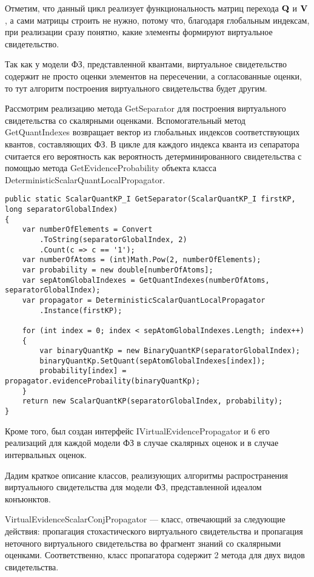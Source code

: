  Отметим, что данный цикл реализует функциональность матриц перехода  $\mathbf{Q}$ и $\mathbf{V}$, а сами матрицы строить не нужно, потому что, благодаря глобальным индексам, при реализации сразу понятно, какие элементы формируют виртуальное свидетельство.
 
 Так как у модели ФЗ, представленной квантами, виртуальное свидетельство содержит не просто оценки элементов на пересечении, а согласованные оценки, то тут алгоритм построения виртуального свидетельства будет другим. 
 
 Рассмотрим реализацию метода GetSeparator для построения виртуального свидетельства со скалярными оценками.  Вспомогательный метод GetQuantIndexes возвращает вектор из глобальных индексов соответствующих квантов, составляющих ФЗ.  В цикле для каждого индекса кванта из сепаратора считается его вероятность как вероятность детерминированного свидетельства с помощью метода GetEvidenceProbability объекта класса DeterministicScalarQuantLocalPropagator.
 
 \begin{lstlisting}[caption = Метод построения виртуального видетельства со скалярными оценками над квантами]
public static ScalarQuantKP_I GetSeparator(ScalarQuantKP_I firstKP, long separatorGlobalIndex)
{
    var numberOfElements = Convert
        .ToString(separatorGlobalIndex, 2)
        .Count(c => c == '1');
    var numberOfAtoms = (int)Math.Pow(2, numberOfElements);
    var probability = new double[numberOfAtoms];
    var sepAtomGlobalIndexes = GetQuantIndexes(numberOfAtoms, separatorGlobalIndex);
    var propagator = DeterministicScalarQuantLocalPropagator
    	.Instance(firstKP);
            
    for (int index = 0; index < sepAtomGlobalIndexes.Length; index++)
    {
        var binaryQuantKp = new BinaryQuantKP(separatorGlobalIndex);
        binaryQuantKp.SetQuant(sepAtomGlobalIndexes[index]);
        probability[index] = propagator.evidenceProbaility(binaryQuantKp);
    }
    return new ScalarQuantKP(separatorGlobalIndex, probability);
}
\end{lstlisting}

Кроме того, был создан интерфейс IVirtualEvidencePropagator и 6 его реализаций для каждой модели ФЗ в случае скалярных оценок и в случае интервальных оценок.

Дадим краткое описание классов, реализующих алгоритмы распространения виртуального свидетельства для модели ФЗ, представленной идеалом конъюнктов. 

 VirtualEvidenceScalarConjPropagator --- класс, отвечающий за следующие действия: пропагация стохастического виртуального свидетельства и пропагация неточного виртуального свидетельства во фрагмент знаний со скалярными оценками. Соответственно, класс пропагатора содержит 2 метода для двух видов свидетельства. 
 
